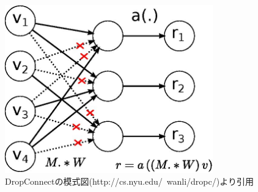 \begin{figure}[tbp]
 \begin{center}
  \includegraphics[width=90mm]{img/c3/nn_dc}
 \end{center}
 \caption{DropConnectの模式図(http://cs.nyu.edu/~wanli/dropc/)より引用}
 \label{c3_dropconnect}
\end{figure}

